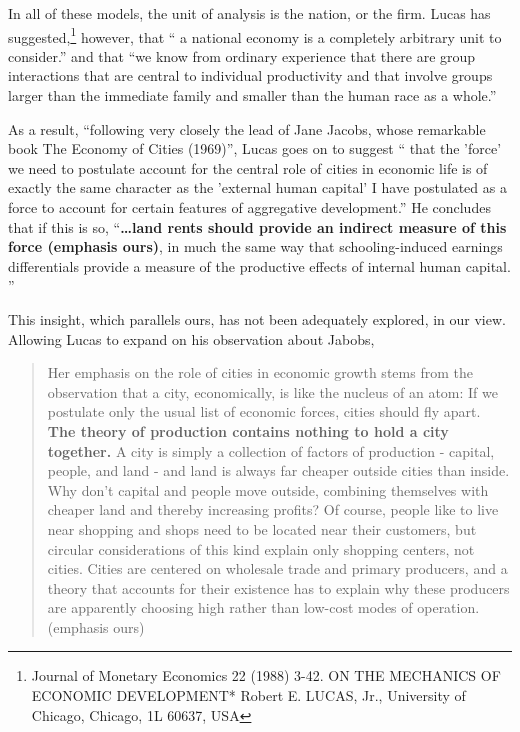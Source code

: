 In all of these models, the unit of analysis is the nation,  or the firm. Lucas has suggested,\footnote{Journal of Monetary Economics 22 (1988) 3-42.  ON THE MECHANICS OF ECONOMIC DEVELOPMENT*
Robert E. LUCAS, Jr., University of Chicago, Chicago, 1L 60637, USA}
however, that `` a national economy is a completely arbitrary unit to consider.'' and that ``we know from ordinary experience that there are group interactions that are central to individual productivity and that involve groups larger than the immediate family and smaller than the human race as a whole.''  

As a result, ``following very closely the lead of Jane Jacobs, whose remarkable book The Economy of Cities (1969)'', Lucas goes on to suggest `` that the 'force' we need to postulate account for the central role of cities in economic life is of exactly the same character as the 'external human capital' I have postulated as a force to account for certain features of aggregative development.''  He concludes that if this is so, ``\textbf{\dots land rents should provide an indirect measure of this force (emphasis  ours)}, in much the same way that schooling-induced earnings differentials provide a measure of the productive effects of internal human capital. ''

This insight, which parallels ours, has not been adequately explored, in our view.  Allowing Lucas to expand on his observation about Jabobs, 



\begin{quotation}
    Her emphasis on the role of cities in economic growth stems from the observation that a city, economically, is like the nucleus of an atom: If we postulate only the usual list of economic forces, cities should fly apart. \textbf{The theory of production contains nothing to hold a city together.} A city is simply a collection of factors of production - capital, people, and land - and land is always far cheaper outside cities than inside. Why don't capital and people move outside, combining themselves with cheaper land and thereby increasing profits? Of course, people like to live near shopping and shops need to be located near their customers, but circular considerations of this kind explain only shopping centers, not cities. Cities are centered on wholesale trade and primary producers, and a theory that accounts for their existence has to explain why these producers are apparently choosing high rather than low-cost modes of operation. (emphasis ours)
\end{quotation}

